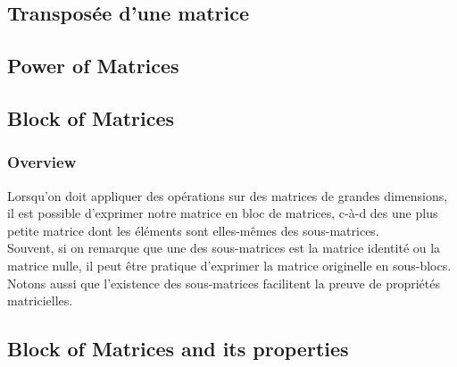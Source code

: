 \documentclass{article}
\begin{document}
\begin{definition}
\end{definition}

\begin{theorem}
\end{theorem}

\subsection{Transposée d'une matrice}
\begin{definition}
\end{definition}

\begin{theorem}
\end{theorem}

\subsection{Power of Matrices}%
\label{sub:Power of Matrices}

\subsection{Block of Matrices}%
\label{sub:Block of Matrices}

\subsubsection{Overview}%
\label{ssub:Overview}

Lorsqu'on doit appliquer des opérations sur des matrices de grandes
dimensions, il est possible d'exprimer notre matrice en bloc de matrices,
c-à-d des une plus petite matrice dont les éléments sont elles-mêmes
des sous-matrices.\\

Souvent, si on remarque que une des sous-matrices est la matrice identité ou
la matrice nulle, il peut être pratique d'exprimer la matrice originelle
en sous-blocs.\\

Notons aussi que l'existence des sous-matrices facilitent la preuve de
propriétés matricielles.

\subsection{Block of Matrices and its properties}%
\label{sub:Block of Matrices and its properties}
\end{document}
